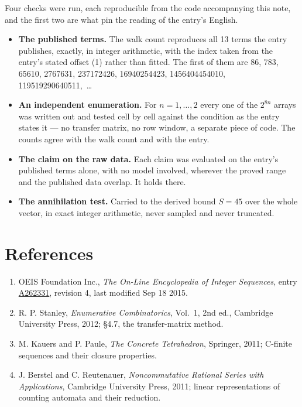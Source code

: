 \documentclass[11pt]{article}
\theoremstyle{definition}
\begin{document}
Four checks were run, each reproducible from the code accompanying this note, and the first two are what pin the reading of the entry's English.

\begin{itemize}

\item {\bfseries The published terms.} The walk count reproduces all 13 terms the entry publishes, exactly, in integer arithmetic, with the index taken from the entry's stated offset (1) rather than fitted. The first of them are 86, 783, 65610, 2767631, 237172426, 16940254423, 1456404454010, 119519290640511,~\dots

\item {\bfseries An independent enumeration.} For $n = 1,\dots,2$ every one of the $2^{8n}$ arrays was written out and tested cell by cell against the condition as the entry states it --- no transfer matrix, no row window, a separate piece of code. The counts agree with the walk count and with the entry.

\item {\bfseries The claim on the raw data.} Each claim was evaluated on the entry's published terms alone, with no model involved, wherever the proved range and the published data overlap. It holds there.

\item {\bfseries The annihilation test.} Carried to the derived bound $S = 45$ over the whole vector, in exact integer arithmetic, never sampled and never truncated.

\end{itemize}

\section{References}

\begin{enumerate}

\item OEIS Foundation Inc., \emph{The On-Line Encyclopedia of Integer Sequences}, entry \href{https://oeis.org/A262331}{A262331}, revision 4, last modified Sep 18 2015.

\item R. P. Stanley, \emph{Enumerative Combinatorics}, Vol.~1, 2nd ed., Cambridge University Press, 2012; \S4.7, the transfer-matrix method.

\item M. Kauers and P. Paule, \emph{The Concrete Tetrahedron}, Springer, 2011; C-finite sequences and their closure properties.

\item J. Berstel and C. Reutenauer, \emph{Noncommutative Rational Series with Applications}, Cambridge University Press, 2011; linear representations of counting automata and their reduction.

\end{enumerate}
\end{document}

